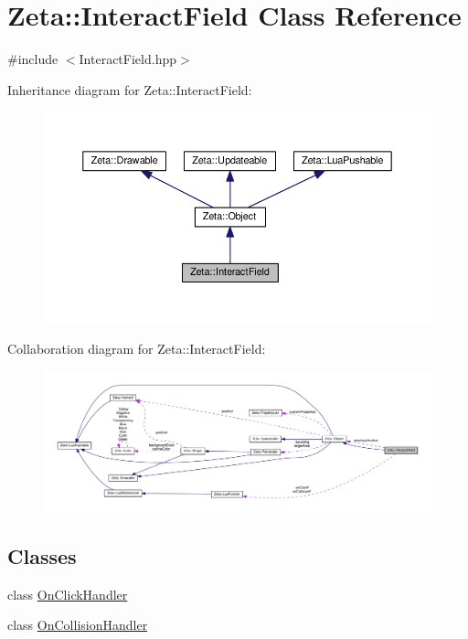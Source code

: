 \hypertarget{classZeta_1_1InteractField}{\section{Zeta\+:\+:Interact\+Field Class Reference}
\label{classZeta_1_1InteractField}
}


{\ttfamily \#include $<$Interact\+Field.\+hpp$>$}



Inheritance diagram for Zeta\+:\+:Interact\+Field\+:\nopagebreak
\begin{figure}[H]
\begin{center}
\leavevmode
\includegraphics[width=350pt]{classZeta_1_1InteractField__inherit__graph}
\end{center}
\end{figure}


Collaboration diagram for Zeta\+:\+:Interact\+Field\+:\nopagebreak
\begin{figure}[H]
\begin{center}
\leavevmode
\includegraphics[width=350pt]{classZeta_1_1InteractField__coll__graph}
\end{center}
\end{figure}
\subsection*{Classes}
\begin{DoxyCompactItemize}
\item 
class \hyperlink{classZeta_1_1InteractField_1_1OnClickHandler}{On\+Click\+Handler}
\item 
class \hyperlink{classZeta_1_1InteractField_1_1OnCollisionHandler}{On\+Collision\+Handler}
\end{DoxyCompactItemize}
